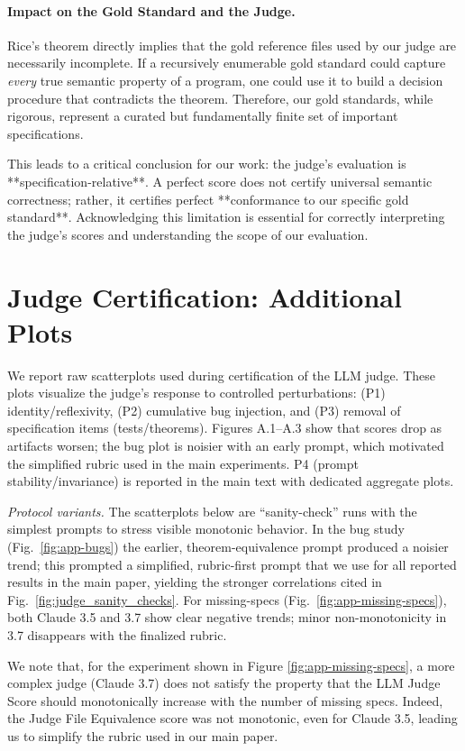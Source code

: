 \documentclass[numbers]{article}
\begin{document}
\paragraph{Impact on the Gold Standard and the Judge.}
Rice's theorem directly implies that the gold reference files used by our judge are necessarily incomplete. If a recursively enumerable gold standard could capture \emph{every} true semantic property of a program, one could use it to build a decision procedure that contradicts the theorem. Therefore, our gold standards, while rigorous, represent a curated but fundamentally finite set of important specifications.

This leads to a critical conclusion for our work: the judge's evaluation is **specification-relative**. A perfect score does not certify universal semantic correctness; rather, it certifies perfect **conformance to our specific gold standard**. Acknowledging this limitation is essential for correctly interpreting the judge's scores and understanding the scope of our evaluation.


\section{Judge Certification: Additional Plots}\label{app:judge-cert}
We report raw scatterplots used during certification of the LLM judge. These plots visualize the judge’s response to controlled perturbations: (P1) identity/reflexivity, (P2) cumulative bug injection, and (P3) removal of specification items (tests/theorems). Figures A.1–A.3 show that scores drop as artifacts worsen; the bug plot is noisier with an early prompt, which motivated the simplified rubric used in the main experiments. P4 (prompt stability/invariance) is reported in the main text with dedicated aggregate plots.

\textit{Protocol variants.} The scatterplots below are “sanity-check” runs with the simplest prompts to stress visible monotonic behavior. In the bug study (Fig.~\ref{fig:app-bugs}) the earlier, theorem-equivalence prompt produced a noisier trend; this prompted a simplified, rubric-first prompt that we use for all reported results in the main paper, yielding the stronger correlations cited in Fig.~\ref{fig:judge_sanity_checks}. For missing-specs (Fig.~\ref{fig:app-missing-specs}), both Claude 3.5 and 3.7 show clear negative trends; minor non-monotonicity in 3.7 disappears with the finalized rubric.

We note that, for the experiment shown in Figure \ref{fig:app-missing-specs}, a more complex judge (Claude 3.7) does not satisfy the property that the LLM Judge Score should monotonically increase with the number of missing specs. Indeed, the Judge File Equivalence score was not monotonic, even for Claude 3.5, leading us to simplify the rubric used in our main paper.
\end{document}
